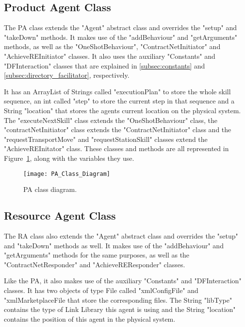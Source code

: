 \subsection{Product Agent Class}
\label{subsec:product_agent}

The \acrlong{PA} class extends the "Agent" abstract class and overrides the "setup" and "takeDown" methods. It makes use of the "addBehaviour" and "getArguments" methods, as well as the "OneShotBehaviour", "ContractNetInitiator" and "AchieveREInitiator" classes. It also uses the auxiliary "Constants" and "DFInteraction" classes that are explained in \ref{subsec:constants} and \ref{subsec:directory_facilitator}, respectively.

It has an ArrayList of Strings called "executionPlan" to store the whole skill sequence, an int called "step" to store the current step in that sequence and a String "location" that stores the agents current location on the physical system.\\

The "executeNextSkill" class extends the "OneShotBehaviour" class, the "contractNetInitiator" class extends the "ContractNetInitiator" class and the "requestTransportMove" and "requestStationSkill" classes extend the "AchieveREInitator" class. These classes and methods are all represented in Figure~\ref{fig:pa_class_diagram}, along with the variables they use.\\

\begin{figure}[h!]
	\centering
	\texttt{[image: PA\_Class\_Diagram]}
	\caption{\acrlong{PA} class diagram.}
	\label{fig:pa_class_diagram}
\end{figure}

\subsection{Resource Agent Class}
\label{subsec:resource_agent}

The \acrlong{RA} class also extends the "Agent" abstract class and overrides the "setup" and "takeDown" methods as well. It makes use of the "addBehaviour" and "getArguments" methods for the same purposes, as well as the "ContractNetResponder" and "AchieveREResponder" classes.

Like the \acrshort{PA}, it also makes use of the auxiliary "Constants" and "DFInteraction" classes. It has two objects of type File called "xmlConfigFile" and "xmlMarketplaceFile that store the corresponding files. The String "libType" contains the type of Link Library this agent is using and the String "location" contains the position of this agent in the physical system.

